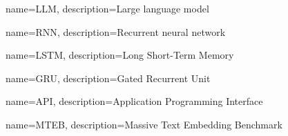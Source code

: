 {
    name={LLM},
    description={Large language model}
}

{
    name={RNN},
    description={Recurrent neural network}
}

{
    name={LSTM},
    description={Long Short-Term Memory}
}

{
    name={GRU},
    description={Gated Recurrent Unit}
}

{
    name={API},
    description={Application Programming Interface}
}

{
    name={MTEB},
    description={Massive Text Embedding Benchmark}
}


\glsaddall
